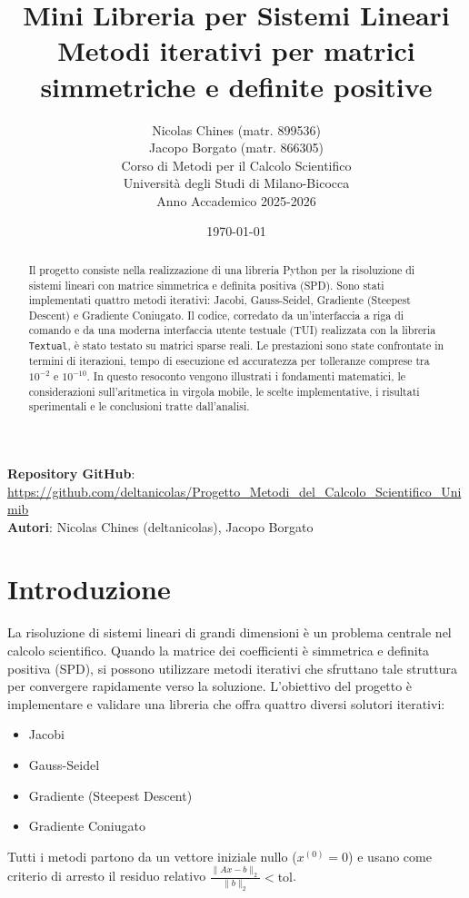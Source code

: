 \documentclass[a4paper,12pt]{article}
\title{\textbf{Mini Libreria per Sistemi Lineari}\\[5pt]
       \large Metodi iterativi per matrici simmetriche e definite positive}
\author{
    Nicolas Chines (matr. 899536)\\
    Jacopo Borgato (matr. 866305)\\[10pt]
    Corso di Metodi per il Calcolo Scientifico\\
    Università degli Studi di Milano-Bicocca\\
    Anno Accademico 2025-2026
}
\date{\today}
\begin{document}
\maketitle
\thispagestyle{empty}

\begin{abstract}
Il progetto consiste nella realizzazione di una libreria Python per la risoluzione di sistemi lineari con matrice simmetrica e definita positiva (SPD). Sono stati implementati quattro metodi iterativi: Jacobi, Gauss-Seidel, Gradiente (Steepest Descent) e Gradiente Coniugato. Il codice, corredato da un'interfaccia a riga di comando e da una moderna interfaccia utente testuale (TUI) realizzata con la libreria \texttt{Textual}, è stato testato su matrici sparse reali. Le prestazioni sono state confrontate in termini di iterazioni, tempo di esecuzione ed accuratezza per tolleranze comprese tra $10^{-2}$ e $10^{-10}$. In questo resoconto vengono illustrati i fondamenti matematici, le considerazioni sull'aritmetica in virgola mobile, le scelte implementative, i risultati sperimentali e le conclusioni tratte dall'analisi.
\end{abstract}

\vspace{1cm}
\noindent\textbf{Repository GitHub}: \url{https://github.com/deltanicolas/Progetto_Metodi_del_Calcolo_Scientifico_Unimib} \\
\noindent\textbf{Autori}: Nicolas Chines (deltanicolas), Jacopo Borgato

\newpage
\tableofcontents
\newpage

\section{Introduzione}
La risoluzione di sistemi lineari di grandi dimensioni è un problema centrale nel calcolo scientifico. Quando la matrice dei coefficienti è simmetrica e definita positiva (SPD), si possono utilizzare metodi iterativi che sfruttano tale struttura per convergere rapidamente verso la soluzione. L'obiettivo del progetto è implementare e validare una libreria che offra quattro diversi solutori iterativi:
\begin{itemize}
    \item Jacobi
    \item Gauss-Seidel
    \item Gradiente (Steepest Descent)
    \item Gradiente Coniugato
\end{itemize}
Tutti i metodi partono da un vettore iniziale nullo ($x^{(0)} = 0$) e usano come criterio di arresto il residuo relativo $\frac{\|Ax - b\|_2}{\|b\|_2} < \text{tol}$.
\end{document}
